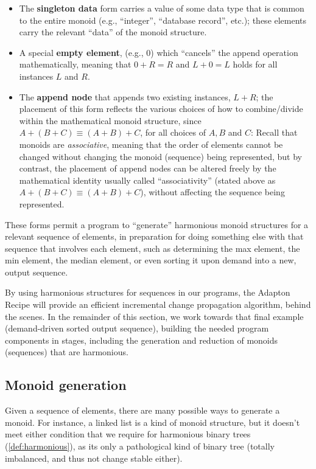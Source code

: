 \documentclass[11pt]{article}
\begin{document}
\begin{itemize}

\item The \textbf{singleton data} form carries a value of some data type that is common to the entire monoid (e.g., ``integer'', ``database record'', etc.); these elements carry the relevant ``data'' of the monoid structure.

\item A special \textbf{empty element}, (e.g., $0$) which ``cancels'' the append operation mathematically, meaning that $0 + R = R$ and $L + 0 = L$ holds for all instances $L$ and $R$.

\item The \textbf{append node} that appends two existing instances, $L + R$; the placement of this form reflects the various choices of how to combine/divide within the mathematical monoid structure, since $A + (B + C) \equiv (A + B) + C$, for all choices of $A, B$ and $C$: Recall that monoids are \emph{associative}, meaning that the order of elements cannot be changed without changing the monoid (sequence) being represented, but by contrast, the placement of append nodes can be altered freely by the mathematical identity usually called ``associativity'' (stated above as $A + (B + C) \equiv (A + B) + C$), without affecting the sequence being represented.

\end{itemize}

These forms permit a program to ``generate'' harmonious monoid structures for
a relevant sequence of elements, in preparation for doing something
else with that sequence that involves each element, such as
determining the max element, the min element, the median element, or
even sorting it upon demand into a new, output sequence.

By using harmonious structures for sequences in our programs, the Adapton Recipe will provide an efficient
incremental change propagation algorithm, behind the scenes.
%
In the remainder of this section, we work towards that final example
(demand-driven sorted output sequence), building the needed program components
in stages, including the generation and reduction of monoids (sequences) that are harmonious.

\subsection{Monoid generation}

Given a sequence of elements, there are many possible ways to generate a monoid.
%
For instance, a linked list is a kind of monoid structure, but it
doesn't meet either condition that we require for harmonious binary trees (\cref{def:harmonious}), as its
only a pathological kind of binary tree (totally imbalanced, and thus
not change stable either).
\end{document}
